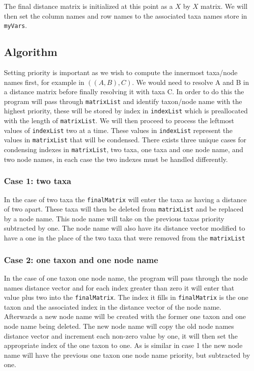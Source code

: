 \documentclass{article}
\begin{document}
The final distance matrix is initialized at this point as a $X$ by $X$ matrix. We will then set the column names and row names to the associated taxa names store in {\tt myVars}. 

\subsection{Algorithm}

Setting priority is important as we wish to compute the innermost taxa/node names first, for example in $((A,B),C)$. We would need to resolve A and B in a distance matrix before finally resolving it with taxa C. In order to do this the program will pass through {\tt matrixList} and identify taxon/node name with the highest priority, these will be stored by index in {\tt indexList} which is preallocated with the length of {\tt matrixList}. We will then proceed to process the leftmost values of {\tt indexList} two at a time. These values in {\tt indexList} represent the values in {\tt matrixList} that will be condensed. There exists three unique cases for condensing indexes in {\tt matrixList}, two taxa, one taxa and one node name, and two node names, in each case the two indexes must be handled differently.

\subsubsection{Case 1: two taxa}
In the case of two taxa the {\tt finalMatrix} will enter the taxa as having a distance of two apart. These taxa will then be deleted from {\tt matrixList} and be replaced by a node name. This node name will take on the previous taxas priority subtracted by one. The node name will also have its distance vector modified to have a one in the place of the two taxa that were removed from the {\tt matrixList}

\subsubsection{Case 2: one taxon and one node name}
In the case of one taxon one node name, the program will pass through the node names distance vector and for each index greater than zero it will enter that value plus two into the {\tt finalMatrix}. The index it fills in {\tt finalMatrix} is the one taxon and the associated index in the distance vector of the node name. Afterwards a new node name will be created with the former one taxon and one node name being deleted. The new node name will copy the old node names distance vector and increment each non-zero value by one, it will then set the appropriate index of the one taxon to one. As is similar in case 1 the new node name will have the previous one taxon one node name priority, but subtracted by one. 
\end{document}
